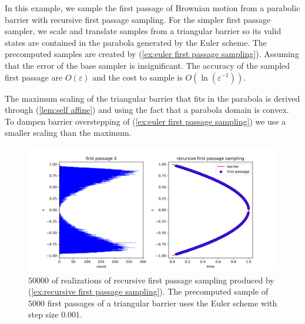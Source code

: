 \documentclass[a4paper,12pt]{article}
\begin{document}
\begin{example} \label{ex:recursive first passage sampling}
    In this example, we sample the first passage of Brownian motion from a parabolic barrier
    with recursive first passage sampling.
    For the simpler first passage sampler, we scale and translate
    samples from a triangular barrier so its
    valid states are contained in the parabola generated
    by the Euler scheme. The precomputed samples are created
    by (\ref{ex:euler first passage sampling}).
    Assuming that the error of the base sampler is insignificant.
    The accuracy of the sampled first passage
    are $O(\varepsilon)$ and the cost to sample is $O(\ln \left(\varepsilon^{-1}\right))$.

    The maximum scaling of the triangular barrier that fits
    in the parabola is derived through (\ref{lem:self affine})
    and using the fact that a parabola domain is convex. To dampen barrier
    overstepping of (\ref{ex:euler first passage sampling}) we use a smaller scaling
    than the maximum.

    \begin{figure}[h!]
        \centering
        \includegraphics[width=1\textwidth]{plots/recursive first passage para.png}
        \caption{ $50000$ of realizations of recursive first passage sampling produced
            by (\ref{ex:recursive first passage sampling}). The precomputed sample of $5000$ first
            passages of a triangular barrier uses the Euler scheme with
            step size $0.001$.}
        \label{fig:recursive first passage para}
    \end{figure}

\end{example}

\end{document}
